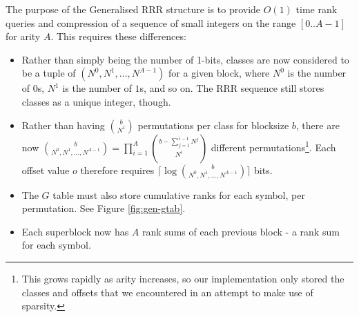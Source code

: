 The purpose of the Generalised RRR structure is to provide $O(1)$ time rank
queries and compression of a sequence of small integers on the range 
$[0..A-1]$ for arity $A$. This requires these differences:

\begin{itemize}
	\item
		Rather than simply being the number of 1-bits, classes are now 
		considered to be a tuple of $(N^0, N^1, ..., N^{A-1})$ for a given 
		block, where $N^0$ is the number of $0$s, $N^1$ is the number of $1$s, 
		and so on. The RRR sequence still stores classes as a unique integer, 
		though.

	\item
		Rather than having $b \choose N^1$ permutations per class for blocksize 
		$b$, there are now ${b \choose N^0, N^1,...,N^{A-1}} = 
		\prod_{i = 1}^{A} {{b - \sum_{j = 1}^{i - 1} N^j} \choose N^i}
		$ different permutations\footnote{This grows rapidly as arity increases, 
		so our implementation only stored the classes and offsets that we 
		encountered in an attempt to make use of sparsity.}.
		Each offset value $o$ therefore requires $\lceil\log {b \choose N^0, 
		N^1,...,N^{A-1}}\rceil$ bits.

	\item
		The $G$ table must also store cumulative ranks for each symbol, per 
		permutation. See Figure \ref{fig:gen-gtab}.

	\item
		Each superblock now has $A$ rank sums of each previous block - a rank 
		sum for each symbol.
\end{itemize}
